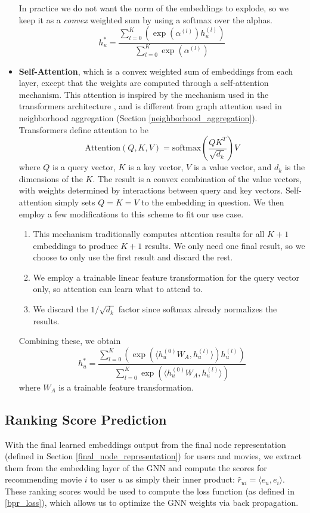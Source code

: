 \documentclass{article}
\begin{document}
\begin{itemize}
    In practice we do not want the norm of the embeddings to explode, so we keep it as a \textit{convex} weighted sum by using a softmax over the alphas.
    $$h_u^*=\frac{\sum_{l=0}^K (\exp(\alpha^{(l)})h_u^{(l)})}{\sum_{l=0}^K \exp(\alpha^{(l)})}$$
    \item \textbf{Self-Attention}, which is a convex weighted sum of embeddings from each layer, except that the weights are computed through a self-attention mechanism. This attention is inspired by the mechanism used in the transformers architecture \cite{transformer}, and is different from graph attention used in neighborhood aggregation (Section \ref{neighborhood_aggregation}). Transformers define attention to be
    $$\text{Attention}(Q,K,V)=\text{softmax}(\frac{QK^T}{\sqrt{d_k}})V$$
    where $Q$ is a query vector, $K$ is a key vector, $V$ is a value vector, and $d_k$ is the dimensions of the $K$. The result is a convex combination of the value vectors, with weights determined by interactions between query and key vectors. Self-attention simply sets $Q=K=V$ to the embedding in question. We then employ a few modifications to this scheme to fit our use case.
    \begin{enumerate}
        \item This mechanism traditionally computes attention results for all $K+1$ embeddings to produce $K+1$ results. We only need one final result, so we choose to only use the first result and discard the rest.
        \item We employ a trainable linear feature transformation for the query vector only, so attention can learn what to attend to.
        \item We discard the $1/\sqrt{d_k}$ factor since softmax already normalizes the results.
    \end{enumerate}
    Combining these, we obtain
    $$h_u^*=\frac{\sum_{l=0}^K (\exp(\langle h_u^{(0)}W_A, h_u^{(l)}\rangle)h_u^{(l)})}{\sum_{l=0}^K \exp(\langle h_u^{(0)}W_A, h_u^{(l)}\rangle)}$$
    where $W_A$ is a trainable feature transformation.
\end{itemize}

\subsection{Ranking Score Prediction}

With the final learned embeddings output from the final node representation (defined in Section \ref{final_node_representation}) for users and movies, we extract them from the embedding layer of the GNN and compute the scores for recommending movie $i$ to user $u$ as simply their inner product: $\hat r_{ui} = \langle e_u {,} e_i \rangle$.
These ranking scores would be used to compute the loss function (as defined in \ref{bpr_loss}), which allows us to optimize the GNN weights via back propagation.
\end{document}
